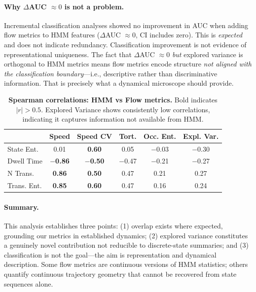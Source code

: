 \documentclass[5p,twocolumn,authoryear]{elsarticle}
\begin{document}
\paragraph{Why $\Delta$AUC $\approx 0$ is not a problem.}
Incremental classification analyses showed no improvement in AUC when adding flow metrics to HMM features ($\Delta$AUC $\approx 0$, CI includes zero). This is \emph{expected} and does not indicate redundancy. Classification improvement is not evidence of representational uniqueness. The fact that $\Delta$AUC $\approx 0$ \emph{but} explored variance is orthogonal to HMM metrics means flow metrics encode structure \emph{not aligned with the classification boundary}---i.e., descriptive rather than discriminative information. That is precisely what a dynamical microscope should provide.

\begin{table}[h]
\centering
\caption{\textbf{Spearman correlations: HMM vs Flow metrics.} Bold indicates $|r| > 0.5$. Explored Variance shows consistently low correlations, indicating it captures information not available from HMM.}
\label{tab:hmm_flow_correlations}
\small
\begin{tabular}{lccccc}
\toprule
& Speed & Speed CV & Tort. & Occ. Ent. & Expl. Var. \\
\midrule
State Ent. & 0.01 & \textbf{0.60} & 0.05 & $-$0.03 & $-$0.30 \\
Dwell Time & \textbf{$-$0.86} & \textbf{$-$0.50} & $-$0.47 & $-$0.21 & $-$0.27 \\
N Trans. & \textbf{0.86} & \textbf{0.50} & 0.47 & 0.21 & 0.27 \\
Trans. Ent. & \textbf{0.85} & \textbf{0.60} & 0.47 & 0.16 & 0.24 \\
\bottomrule
\end{tabular}
\end{table}

\paragraph{Summary.}
This analysis establishes three points: (1) overlap exists where expected, grounding our metrics in established dynamics; (2) explored variance constitutes a genuinely novel contribution not reducible to discrete-state summaries; and (3) classification is not the goal---the aim is representation and dynamical description. Some flow metrics are continuous versions of HMM statistics; others quantify continuous trajectory geometry that cannot be recovered from state sequences alone.
\end{document}

